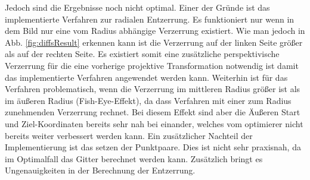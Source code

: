 Jedoch sind die Ergebnisse noch nicht optimal. Einer der Gründe ist
das implementierte Verfahren zur radialen Entzerrung. Es funktioniert nur wenn in dem Bild nur eine vom Radius abhängige Verzerrung existiert. Wie man jedoch in Abb. \ref{fig:diffsResult} erkennen kann ist die Verzerrung auf der linken Seite größer als auf der rechten Seite.
Es existiert somit eine zusätzliche perspektivische Verzerrung für die eine vorherige projektive Transformation notwendig ist damit das implementierte Verfahren angewendet werden kann.
Weiterhin ist für das Verfahren problematisch, wenn die Verzerrung im mittleren Radius größer ist als im äußeren Radius (Fish-Eye-Effekt), da dass Verfahren mit einer zum Radius zunehmenden Verzerrung rechnet. Bei diesem Effekt sind aber die Äußeren Start und Ziel-Koordinaten bereits sehr nah bei einander, welches vom optimierer nicht bereits weiter verbessert werden kann.
Ein zusätzlicher Nachteil der Implementierung ist das setzen der Punktpaare. Dies ist nicht sehr praxisnah, da im Optimalfall das Gitter berechnet werden kann. Zusätzlich bringt es Ungenauigkeiten in der Berechnung der Entzerrung.

